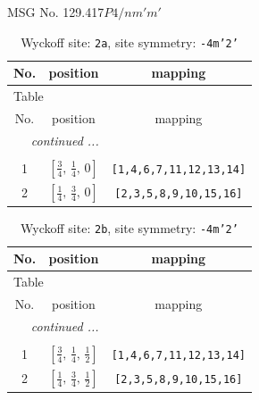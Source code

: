 \documentclass[fleqn,8pt]{jsarticle}
\begin{document}
\setcounter{MaxMatrixCols}{32}

\renewcommand{\tablename}{Table~}
\renewcommand{\figurename}{Figure~}
\begin{center}
\LARGE
MSG No. 129.417\quad$P4/nm'm'$
\end{center}
\renewcommand{\arraystretch}{1.2}
\begin{longtable}{ccc}
\caption{Wyckoff site: {\tt 2a}, site symmetry: {\tt -4m'2'}}
 \\
 \hline \hline
No. & position & mapping \\ \hline \endfirsthead

\multicolumn{2}{l}{\tablename\ \thetable{}} \\
 \hline \hline
No. & position & mapping \\ \hline \endhead

 \hline \hline
\multicolumn{2}{r}{\footnotesize\it continued ...} \\ \endfoot

 \hline \hline
\multicolumn{2}{r}{} \\ \endlastfoot

1 & $\left[ \frac{3}{4},\, \frac{1}{4},\, 0 \right]$ & {\tt [1,4,6,7,11,12,13,14]} \\ \hline
2 & $\left[ \frac{1}{4},\, \frac{3}{4},\, 0 \right]$ & {\tt [2,3,5,8,9,10,15,16]} \\
\end{longtable}
\renewcommand{\arraystretch}{1.2}
\begin{longtable}{ccc}
\caption{Wyckoff site: {\tt 2b}, site symmetry: {\tt -4m'2'}}
 \\
 \hline \hline
No. & position & mapping \\ \hline \endfirsthead

\multicolumn{2}{l}{\tablename\ \thetable{}} \\
 \hline \hline
No. & position & mapping \\ \hline \endhead

 \hline \hline
\multicolumn{2}{r}{\footnotesize\it continued ...} \\ \endfoot

 \hline \hline
\multicolumn{2}{r}{} \\ \endlastfoot

1 & $\left[ \frac{3}{4},\, \frac{1}{4},\, \frac{1}{2} \right]$ & {\tt [1,4,6,7,11,12,13,14]} \\ \hline
2 & $\left[ \frac{1}{4},\, \frac{3}{4},\, \frac{1}{2} \right]$ & {\tt [2,3,5,8,9,10,15,16]} \\
\end{longtable}
\end{document}
